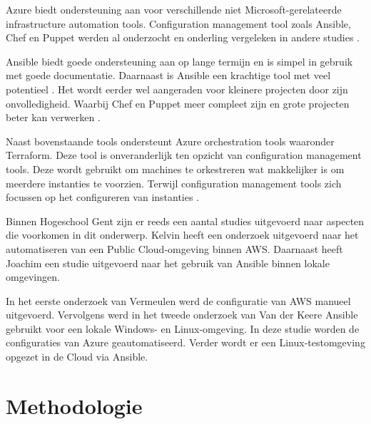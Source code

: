 Azure biedt ondersteuning aan voor verschillende niet Microsoft-gerelateerde infrastructure automation tools. Configuration management tool zoals Ansible, Chef en Puppet werden al onderzocht en onderling vergeleken in andere studies \autocite{Microsoft2022a}. 

Ansible biedt goede ondersteuning aan op \newline lange termijn en is simpel in gebruik met goede documentatie. Daarnaast is Ansible een krachtige tool met veel potentieel \autocite{Masek2018}. Het wordt eerder wel aangeraden voor kleinere projecten door zijn onvolledigheid. Waarbij Chef en Puppet meer compleet zijn en grote projecten beter kan verwerken \autocite{Bertram2016}. 

Naast bovenstaande tools ondersteunt Azure orchestration tools waaronder Terraform. Deze tool is onveranderlijk ten opzicht van configuration management tools. Deze wordt gebruikt om machines te orkestreren wat makkelijker is om meerdere instanties te voorzien. Terwijl configuration management tools zich focussen op het configureren van instanties \autocite{Brikman2016}.

Binnen Hogeschool Gent zijn er reeds een aantal studies uitgevoerd naar aspecten die voorkomen in dit onderwerp. Kelvin \textcite{Vermeulen2021} heeft een onderzoek uitgevoerd naar het automatiseren van een Public Cloud-omgeving binnen AWS. Daarnaast heeft Joachim \textcite{VandeKeere2021} een studie uitgevoerd naar het gebruik van Ansible binnen lokale omgevingen. 

In het eerste onderzoek van Vermeulen werd de configuratie van AWS manueel uitgevoerd. Vervolgens werd in het tweede onderzoek van Van der Keere Ansible gebruikt voor een lokale  \newline Windows- en Linux-omgeving. In deze studie worden de configuraties van Azure geautomatiseerd. Verder wordt er een Linux-testomgeving opgezet in de Cloud via Ansible.

\section{Methodologie}%
\label{sec:methodologie}

